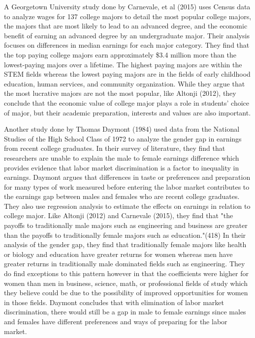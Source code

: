 \documentclass[12pt]{article}
\begin{document}
\par  A Georgetown University study done by Carnevale, et al (2015) uses Census data to analyze wages for 137 college majors to detail the most popular college majors, the majors that are most likely to lead to an advanced degree, and the economic benefit of earning an advanced degree by an undergraduate major. Their analysis focuses on differences in median earnings for each major category. They find that the top paying college majors earn approximately \$3.4 million more than the lowest-paying majors over a lifetime. The highest paying majors are within the STEM fields whereas the lowest paying majors are in the fields of early childhood education, human services, and community organization. While they argue that the most lucrative majors are not the most popular, like Altonji (2012), they conclude that the economic value of college major plays a role in students' choice of major, but their academic preparation, interests and values are also important.

\par Another study done by Thomas Daymont (1984) used data from the National Studies of the High School Class of 1972 to analyze the gender gap in earnings from recent college graduates.  In their survey of literature, they find that researchers are unable to explain the male to female earnings difference which provides evidence that labor market discrimination is a factor to inequality in earnings. Daymont argues that differences in taste or preferences and preparation for many types of work measured before entering the labor market contributes to the earnings gap between males and females who are recent college graduates. They also use regression analysis to estimate the effects on earnings in relation to college major. Like Altonji (2012) and Carnevale (2015), they find that "the payoffs to traditionally male majors such as engineering and business are greater than the payoffs to traditionally female majors such as education."(418) In their analysis of the gender gap, they find that traditionally female majors like health or biology and education have greater returns for women whereas men have greater returns in traditionally male dominated fields such as engineering. They do find exceptions to this pattern however in that the coefficients were higher for women than men in business, science, math, or professional fields of study which they believe could be due to the possibility of improved opportunities for women in those fields. Daymont concludes that with elimination of labor market discrimination, there would still be a gap in male to female earnings since males and females have different preferences and ways of preparing for the labor market.
\end{document}
